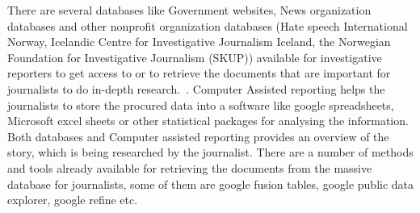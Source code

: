  There are several databases like Government websites, News organization databases and other nonprofit organization databases  (Hate speech International Norway, Icelandic Centre for Investigative Journalism Iceland, the Norwegian Foundation for Investigative Journalism (SKUP)) available for investigative reporters to get access to or to retrieve the documents that are important for journalists to do in-depth research.~\cite{knight2001online}. Computer Assisted reporting helps the journalists to store the procured data into a software like google spreadsheets, Microsoft excel sheets or other statistical packages for analysing the information. Both databases and Computer assisted reporting provides an overview of the story, which is being researched by the journalist. There are a number of methods and tools already available for retrieving the documents from the massive database for journalists, some of them are google fusion tables, google public data explorer, google refine etc.~\cite{defleur2013computer}\\
 
